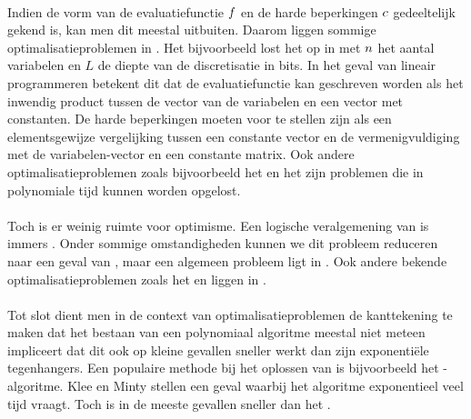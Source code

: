 \paragraph{}
Indien de vorm van de evaluatiefunctie $f$ en de harde beperkingen $c$ gedeeltelijk gekend is, kan men dit meestal uitbuiten. Daarom liggen sommige optimalisatieproblemen in . Het \cite{linearProgrammingInP} bijvoorbeeld lost het  op in  met $n$ het aantal variabelen en $L$ de diepte van de discretisatie in bits. In het geval van lineair programmeren betekent dit dat de evaluatiefunctie kan geschreven worden als het inwendig product tussen de vector van de variabelen en een vector met constanten. De harde beperkingen moeten voor te stellen zijn als een elementsgewijze vergelijking tussen een constante vector en de vermenigvuldiging met de variabelen-vector en een constante matrix. Ook andere optimalisatieproblemen zoals bijvoorbeeld het  en het  zijn problemen die in polynomiale tijd kunnen worden opgelost.

\paragraph{}
Toch is er weinig ruimte voor optimisme. Een logische veralgemening van  is immers . Onder sommige omstandigheden kunnen we dit probleem reduceren\cite{Kozlov1980223} naar een geval van , maar een algemeen  probleem ligt in \cite{qpInNP}. Ook andere bekende optimalisatieproblemen zoals het  en  liggen in .

\paragraph{}
Tot slot dient men in de context van optimalisatieproblemen de kanttekening te maken dat het bestaan van een polynomiaal algoritme meestal niet meteen impliceert dat dit ook op kleine gevallen sneller werkt dan zijn exponenti\"ele tegenhangers. Een populaire methode bij het oplossen van  is bijvoorbeeld het -algoritme. Klee en Minty\cite{klee:1972} stellen een geval waarbij het algoritme exponentieel veel tijd vraagt. Toch is  in de meeste gevallen sneller dan het .